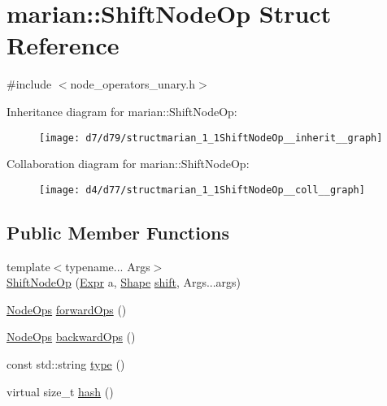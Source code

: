 \hypertarget{structmarian_1_1ShiftNodeOp}{}\section{marian\+:\+:Shift\+Node\+Op Struct Reference}
\label{structmarian_1_1ShiftNodeOp}


{\ttfamily \#include $<$node\+\_\+operators\+\_\+unary.\+h$>$}



Inheritance diagram for marian\+:\+:Shift\+Node\+Op\+:
\nopagebreak
\begin{figure}[H]
\begin{center}
\leavevmode
\texttt{[image: d7/d79/structmarian\_1\_1ShiftNodeOp\_\_inherit\_\_graph]}
\end{center}
\end{figure}


Collaboration diagram for marian\+:\+:Shift\+Node\+Op\+:
\nopagebreak
\begin{figure}[H]
\begin{center}
\leavevmode
\texttt{[image: d4/d77/structmarian\_1\_1ShiftNodeOp\_\_coll\_\_graph]}
\end{center}
\end{figure}
\subsection*{Public Member Functions}
\begin{DoxyCompactItemize}
\item 
{\footnotesize template$<$typename... Args$>$ }\\\hyperlink{structmarian_1_1ShiftNodeOp_a11c4d56e48c76e7d9c9c1833f5ded975}{Shift\+Node\+Op} (\hyperlink{namespacemarian_a498d8baf75b754011078b890b39c8e12}{Expr} a, \hyperlink{structmarian_1_1Shape}{Shape} \hyperlink{namespacemarian_a763e5e9b5d5a329d2420fe9bab95476d}{shift}, Args...\+args)
\item 
\hyperlink{namespacemarian_a4956376218cc236016c20bc4071470da}{Node\+Ops} \hyperlink{structmarian_1_1ShiftNodeOp_a42cd06dbea0bf66e744d1503a9ff8a1b}{forward\+Ops} ()
\item 
\hyperlink{namespacemarian_a4956376218cc236016c20bc4071470da}{Node\+Ops} \hyperlink{structmarian_1_1ShiftNodeOp_aa23a0bc2d5f513cb6d2f540783a720a3}{backward\+Ops} ()
\item 
const std\+::string \hyperlink{structmarian_1_1ShiftNodeOp_ad76f8eb10fecb4724458cfae39daf283}{type} ()
\item 
virtual size\+\_\+t \hyperlink{structmarian_1_1ShiftNodeOp_a687a08ebcb58fc58deca832b226fe2dd}{hash} ()
\end{DoxyCompactItemize}
